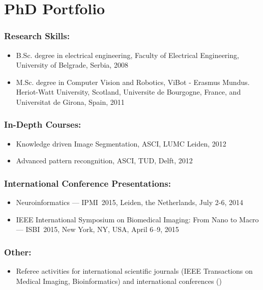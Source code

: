 %
%

\noquote
\orgchpos
\chapter*{PhD Portfolio}

\noindent

\subsection*{Research Skills:}
\vspace{1ex}
\begin{itemize}
	\item B.Sc. degree in electrical engineering, Faculty of Electrical Engineering, University of Belgrade, Serbia, 2008
	\item M.Sc. degree in Computer Vision and Robotics, ViBot - Erasmus Mundus. Heriot-Watt University, Scotland, Universite de Bourgogne, France, and Universitat de Girona, Spain,  2011
\end{itemize}

\subsection*{In-Depth Courses:}
\vspace{1ex}
\begin{itemize}
\item Knowledge driven Image Segmentation, ASCI, LUMC Leiden, 2012
\item Advanced pattern recongnition, ASCI, TUD, Delft, 2012
\end{itemize}

\subsection*{International Conference Presentations:}
\vspace{1ex}
\begin{itemize}
\item Neuroinformatics --- IPMI~2015, Leiden, the Netherlands, July 2-6, 2014
\item IEEE International Symposium on Biomedical Imaging: From Nano to Macro --- ISBI~2015, New York, NY, USA, April 6--9, 2015
\end{itemize}

\subsection*{Other:}
\vspace{1ex}
\begin{itemize}
\item Referee activities for international scientific journals (IEEE Transactions on Medical Imaging, Bioinformatics) and international conferences ()
\end{itemize}
